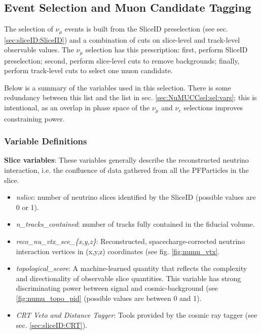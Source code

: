 \label{sec:NuMUCCsel}

\subsection{Event Selection and Muon Candidate Tagging}
\label{ssec:NuMUCCsel:sel}

\par The selection of $\nu_{\mu}$ events is built from the SliceID preselection (see sec. \ref{sec:sliceID:SliceID}) and a combination of cuts on slice-level and track-level observable values. The $\nu_{\mu}$ selection has this prescription: first, perform SliceID preselection; second, perform slice-level cuts to remove backgrounds; finally, perform track-level cuts to select one muon candidate.
\par Below is a summary of the variables used in this selection. There is some redundancy between this list and the list in sec. \ref{sec:NuMUCCsel:sel:vars}; this is intentional, as an overlap in phase space of the $\nu_{\mu}$ and $\nu_{e}$ selections improves constraining power.

\subsubsection{Variable Definitions}
\label{sssec:NuMUCCsel:sel:vars}

\par \noindent \textbf{Slice variables}: These variables generally describe the reconstructed neutrino interaction, i.e. the confluence of data gathered from all the PFParticles in the slice.
\begin{itemize}
    \item \emph{nslice}: number of neutrino slices identified by the SliceID (possible values are 0 or 1).
    \item \emph{n\_tracks\_contained}: number of tracks fully contained in the fiducial volume.
    \item \emph{reco\_nu\_vtx\_sce\_\{x,y,z\}}: Reconstructed, spacecharge-corrected neutrino interaction vertices in (x,y,z) coordinates (see fig. \ref{fig:numu_vtx}.
    \item \emph{topological\_score}: A machine-learned quantity that reflects the complexity and directionality of observable slice quantities. This variable has strong discriminating power between signal and cosmic-background (see \ref{fig:numu_topo_pid} (possible values are between 0 and 1).
    \item \emph{CRT Veto and Distance Tagger}: Tools provided by the cosmic ray tagger (see sec. \ref{sec:sliceID:CRT}).
\end{itemize}


